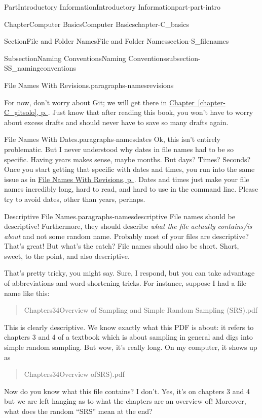 \documentclass[twoside,10pt,]{book}
\newcommand{\xreffont}{\relax}
\begin{document}
\begin{partptx}{Part}{Introductory Information}{}{Introductory Information}{}{}{part-part-intro}
\begin{chapterptx}{Chapter}{Computer Basics}{}{Computer Basics}{}{}{chapter-C_basics}
\begin{sectionptx}{Section}{File and Folder Names}{}{File and Folder Names}{}{}{section-S_filenames}
\begin{subsectionptx}{Subsection}{Naming Conventions}{}{Naming Conventions}{}{}{subsection-SS_namingconventions}
\begin{paragraphs}{File Names With Revisions.}{paragraphs-namesrevisions}
\par
For now, don't worry about Git; we will get there in \hyperref[chapter-C_gitsolo]{Chapter~{\xreffont\ref{chapter-C_gitsolo}}, p.\,\pageref{chapter-C_gitsolo}}. Just know that after reading this book, you won't have to worry about excess drafts and should never have to save so many drafts again.%
\end{paragraphs}%
\begin{paragraphs}{File Names With Dates.}{paragraphs-namesdates}%
%
Ok, this isn't entirely problematic. But I never understood why dates in file names had to be so specific. Having years makes sense, maybe months. But days? Times? Seconds? Once you start getting that specific with dates and times, you run into the same issue as in \hyperlink{paragraphs-namesrevisions}{File Names With Revisions, p.\,\pageref{paragraphs-namesrevisions}}. Dates and times just make your file names incredibly long, hard to read, and hard to use in the command line. Please try to avoid dates, other than years, perhaps.%
\end{paragraphs}%
\begin{paragraphs}{Descriptive File Names.}{paragraphs-namesdescriptive}%
%
%
File names should be descriptive! Furthermore, they should describe \emph{what the file actually contains\slash{}is about} and not some random name. Probably most of your files are descriptive? That's great! But what's the catch? File names should also be short. Short, sweet, to the point, and also descriptive.%
\par
That's pretty tricky, you might say. Sure, I respond, but you can take advantage of abbreviations and word-shortening tricks. For instance, suppose I had a file name like this:%
\begin{quote}%
Chapters3\textunderscore{}4\textunderscore{}Overview of Sampling and Simple Random Sampling (SRS).pdf%
\end{quote}
This is clearly descriptive. We know exactly what this PDF is about: it refers to chapters 3 and 4 of a textbook which is about sampling in general and digs into simple random sampling. But wow, it's really long. On my computer, it shows up as%
\begin{quote}%
Chapters3\textunderscore{}4\textunderscore{}Overview of\textellipsis{}SRS).pdf%
\end{quote}
Now do you know what this file contains? I don't. Yes, it's on chapters 3 and 4 but we are left hanging as to what the chapters are an overview of! Moreover, what does the random ``SRS'' mean at the end?%

\end{paragraphs}
\end{subsectionptx}
\end{sectionptx}
\end{chapterptx}
\end{partptx}
\end{document}
